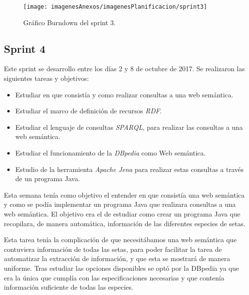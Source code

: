 \begin{figure}[h]
    \begin{center}%
        \begin{center}%
          \texttt{[image: imagenesAnexos/imagenesPlanificacion/sprint3]}%
          \caption{Gráfico Burndown del sprint 3.}%
          \label{figSprint3}%
        \end{center}%
  	\end{center}%
\end{figure}%

\newpage

\subsection{Sprint 4}

Este sprint se desarrollo entre los días 2 y 8 de octubre de 2017. Se realizaron las siguientes tareas y objetivos:

\begin{itemize}
	\item Estudiar en que consistía y como realizar consultas a una web semántica.
	\item Estudiar el marco de definición de recursos \textit{RDF}.
	\item Estudiar el lenguaje de consultas \textit{SPARQL}, para realizar las consultas a una web semántica.
	\item Estudiar el funcionamiento de la \textit{DBpedia} como Web semántica.
	\item Estudio de la herramienta \textit{Apache Jena} para realizar estas consultas a través de un programa Java.
	
\end{itemize}

Esta semana tenía como objetivo el entender en que consistía una web semántica y como se podía implementar un programa Java que realizara consultas a una web semántica. El objetivo era el de estudiar como crear un programa Java que recopilara, de manera automática, información de las diferentes especies de setas.

Esta tarea tenía la complicación de que necesitábamos una web semántica que contuviera información de todas las setas, para poder facilitar la tarea de automatizar la extracción de información, y que esta se mostrará de manera uniforme. Tras estudiar las opciones disponibles se optó por la DBpedia ya que era la única que cumplía con las especificaciones necesarias y que contenía información suficiente de todas las especies.

